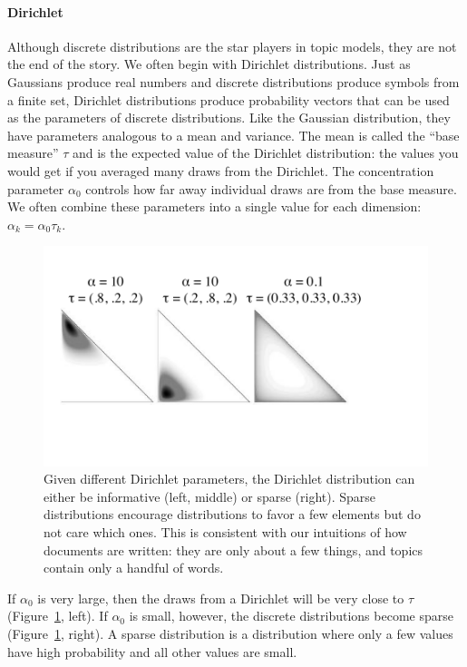 \paragraph{Dirichlet}

Although discrete distributions are the star players in topic models, they are
not the end of the story.  We often begin with Dirichlet distributions.
Just as Gaussians produce real numbers and discrete distributions produce symbols from a finite set, Dirichlet distributions produce probability vectors that can be used as the parameters of discrete distributions.
Like the Gaussian distribution, they have parameters analogous to a mean and
variance.  The mean is called the ``base measure'' $\tau$ and is the expected
value of the Dirichlet distribution: the values you would get if you averaged many draws from the
Dirichlet.  The concentration parameter $\alpha_0$ controls how far away individual draws are from the base measure.
We often combine these parameters into a single value for each dimension: $\alpha_k = \alpha_0 \tau_k$.

\begin{center}
\begin{figure}
  \centering
  \includegraphics[width=.8\linewidth]{figures/dirichlet}
  \caption{Given different Dirichlet parameters, the Dirichlet
    distribution can either be informative (left, middle) or sparse
    (right).  Sparse distributions encourage distributions to favor
 a few elements but do not care which ones.  This
    is consistent with our intuitions of how documents are written:
    they are only about a few things, and topics contain only a
    handful of words.}
  \label{fig:dirichlet_sparsity}
\end{figure}
\end{center}

If $\alpha_0$ is very large, then the draws from a Dirichlet will be very close to
$\tau$ (Figure~\ref{fig:dirichlet_sparsity}, left).  If $\alpha_0$ is
small, however, the discrete distributions become sparse
(Figure~\ref{fig:dirichlet_sparsity}, right).  A sparse distribution is a
distribution where only a few values have high probability and all other values are small.

